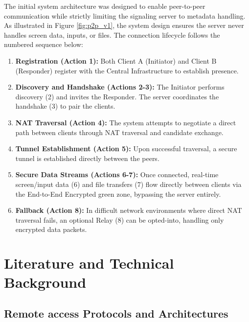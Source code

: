 \documentclass[12pt,a4paper]{article}
\begin{document}
The initial system architecture was designed to enable peer-to-peer communication while strictly limiting the signaling server to metadata handling. As illustrated in Figure \ref{fig:p2p_v1}, the system design ensures the server never handles screen data, inputs, or files. The connection lifecycle follows the numbered sequence below:

\begin{enumerate}
    \item \textbf{Registration (Action 1):} Both Client A (Initiator) and Client B (Responder) register with the Central Infrastructure to establish presence.
    
    \item \textbf{Discovery and Handshake (Actions 2-3):} The Initiator performs discovery (2) and invites the Responder. The server coordinates the handshake (3) to pair the clients.
    
    \item \textbf{NAT Traversal (Action 4):} The system attempts to negotiate a direct path between clients through NAT traversal and candidate exchange.
    
    \item \textbf{Tunnel Establishment (Action 5):} Upon successful traversal, a secure tunnel is established directly between the peers.
    
    \item \textbf{Secure Data Streams (Actions 6-7):} Once connected, real-time screen/input data (6) and file transfers (7) flow directly between clients via the End-to-End Encrypted green zone, bypassing the server entirely.
    
    \item \textbf{Fallback (Action 8):} In difficult network environments where direct NAT traversal fails, an optional Relay (8) can be opted-into, handling only encrypted data packets.
\end{enumerate}

\section{Literature and Technical Background}

\subsection{Remote access Protocols and Architectures}
\end{document}
